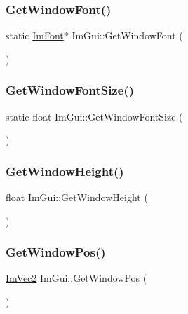 \subsubsection{\texorpdfstring{Get\+Window\+Font()}{GetWindowFont()}}
{\footnotesize\ttfamily static \hyperlink{struct_im_font}{Im\+Font}$\ast$ Im\+Gui\+::\+Get\+Window\+Font (\begin{DoxyParamCaption}{ }\end{DoxyParamCaption})\hspace{0.3cm}{\ttfamily [static]}}

\hypertarget{namespace_im_gui_a71a2ce54252d4f142228e9cedb741a52}{}\label{namespace_im_gui_a71a2ce54252d4f142228e9cedb741a52} 
\subsubsection{\texorpdfstring{Get\+Window\+Font\+Size()}{GetWindowFontSize()}}
{\footnotesize\ttfamily static float Im\+Gui\+::\+Get\+Window\+Font\+Size (\begin{DoxyParamCaption}{ }\end{DoxyParamCaption})\hspace{0.3cm}{\ttfamily [static]}}

\hypertarget{namespace_im_gui_a44d2bfb80e0d2dd232a553ab29a91b52}{}\label{namespace_im_gui_a44d2bfb80e0d2dd232a553ab29a91b52} 
\subsubsection{\texorpdfstring{Get\+Window\+Height()}{GetWindowHeight()}}
{\footnotesize\ttfamily float Im\+Gui\+::\+Get\+Window\+Height (\begin{DoxyParamCaption}{ }\end{DoxyParamCaption})}

\hypertarget{namespace_im_gui_a413d939f3ef416a47d6e5b48be955146}{}\label{namespace_im_gui_a413d939f3ef416a47d6e5b48be955146} 
\subsubsection{\texorpdfstring{Get\+Window\+Pos()}{GetWindowPos()}}
{\footnotesize\ttfamily \hyperlink{struct_im_vec2}{Im\+Vec2} Im\+Gui\+::\+Get\+Window\+Pos (\begin{DoxyParamCaption}{ }\end{DoxyParamCaption})}

